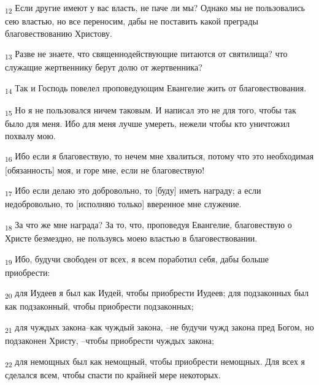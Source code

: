 \begin{tcolorbox}
\textsubscript{12} Если другие имеют у вас власть, не паче ли мы? Однако мы не пользовались сею властью, но все переносим, дабы не поставить какой преграды благовествованию Христову.
\end{tcolorbox}
\begin{tcolorbox}
\textsubscript{13} Разве не знаете, что священнодействующие питаются от святилища? что служащие жертвеннику берут долю от жертвенника?
\end{tcolorbox}
\begin{tcolorbox}
\textsubscript{14} Так и Господь повелел проповедующим Евангелие жить от благовествования.
\end{tcolorbox}
\begin{tcolorbox}
\textsubscript{15} Но я не пользовался ничем таковым. И написал это не для того, чтобы так было для меня. Ибо для меня лучше умереть, нежели чтобы кто уничтожил похвалу мою.
\end{tcolorbox}
\begin{tcolorbox}
\textsubscript{16} Ибо если я благовествую, то нечем мне хвалиться, потому что это необходимая [обязанность] моя, и горе мне, если не благовествую!
\end{tcolorbox}
\begin{tcolorbox}
\textsubscript{17} Ибо если делаю это добровольно, то [буду] иметь награду; а если недобровольно, то [исполняю только] вверенное мне служение.
\end{tcolorbox}
\begin{tcolorbox}
\textsubscript{18} За что же мне награда? За то, что, проповедуя Евангелие, благовествую о Христе безмездно, не пользуясь моею властью в благовествовании.
\end{tcolorbox}
\begin{tcolorbox}
\textsubscript{19} Ибо, будучи свободен от всех, я всем поработил себя, дабы больше приобрести:
\end{tcolorbox}
\begin{tcolorbox}
\textsubscript{20} для Иудеев я был как Иудей, чтобы приобрести Иудеев; для подзаконных был как подзаконный, чтобы приобрести подзаконных;
\end{tcolorbox}
\begin{tcolorbox}
\textsubscript{21} для чуждых закона--как чуждый закона, --не будучи чужд закона пред Богом, но подзаконен Христу, --чтобы приобрести чуждых закона;
\end{tcolorbox}
\begin{tcolorbox}
\textsubscript{22} для немощных был как немощный, чтобы приобрести немощных. Для всех я сделался всем, чтобы спасти по крайней мере некоторых.
\end{tcolorbox}
